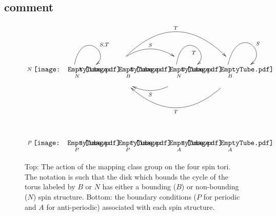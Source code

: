 \documentclass[12pt,a4paper]{article}
\newcommand{\FubeXXX}{\mathord{\vcenter{\hbox{\texttt{[image: EmptyTube.pdf]}}}}}
\begin{document}
 
\subsection{comment} 
\begin{figure} \label{spin_str_mapping_class_group}
\newcommand{\Space}{\; \; \; \; \; \; }
\newcommand{\Spacep}{ \; \; \; \mathop{\vphantom{\int}} \; \; \;    }
\begin{align}
\xymatrix @!0 @M=1mm @R=6mm @C=25mm{
&&&\\
\Space   & \Space  \ar@/^1pc/[r]^{S} \Space  \ar@/^3pc/[rr]^{T} &\Space &\Space   \\
\raisebox{0.2ex}{$\scriptstyle{N}\;$}\underset{N}{\FubeXXX} \ar @`{(3,15),(28,-12)}^{S,T}  &
\raisebox{0.2ex}{$\scriptstyle{N}\;$}\underset{B}{\FubeXXX} & 
\raisebox{0.2ex}{$\scriptstyle{B}\;$}\underset{N}{\FubeXXX}  \ar @`{(52,15),(77,-12)}_{T} & 
\raisebox{0.2ex}{$\scriptstyle{B}\;$}\underset{B}{\FubeXXX}  \ar @`{(80,18),(105,-12)}^{S}  \\
{\Spacep} &\Spacep &\Spacep \ar@/^1pc/[l]^{S} &\Spacep  \ar@/^3pc/[ll]^{T} \\
&&&\\
&&&\\
&&&\\
&&&\\
\raisebox{0.2ex}{$\scriptstyle{P}\;$}\underset{P}{\FubeXXX} &
\raisebox{0.2ex}{$\scriptstyle{A}\;$}\underset{P}{\FubeXXX} & 
\raisebox{0.2ex}{$\scriptstyle{P}\;$}\underset{A}{\FubeXXX} & 
\raisebox{0.2ex}{$\scriptstyle{A}\;$}\underset{A}{\FubeXXX} 
}
\end{align} \nonumber
\caption{Top: The action of the mapping class group on the four spin tori. 
The notation is such that the disk which bounds the cycle of the torus labeled by $B$ or $N$ 
has either a bounding ($B$) or non-bounding ($N$) spin structure. Bottom: the boundary conditions 
($P$ for periodic and $A$ for anti-periodic) associated with each spin structure.}
\end{figure}
 
 

 
\end{document}
